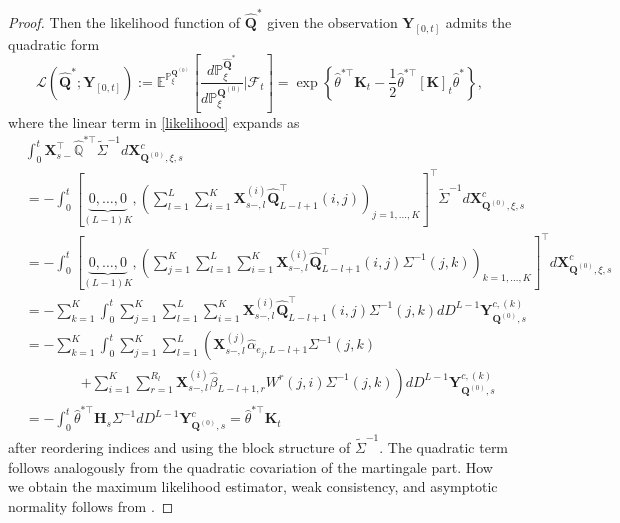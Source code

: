 \documentclass[12pt]{amsart}
\numberwithin{equation}{section}
\newcommand{\E}{\mathbb{E}}
\newcommand{\1}{\mathbf{1}}
\begin{document}
\begin{proof}
Then the likelihood function of $\hat{\mathbf{Q}}^*$ given the observation $\mathbf{Y}_{[0,t]}$ admits the quadratic form
\begin{equation}
\label{likelihoodquad}
\mathcal{L}\left(\hat{\mathbf{Q}}^*;\mathbf{Y}_{[0,t]}\right) := \E^{\mathbb{P}^{\mathbf{Q}^{(0)}}_{\xi}}\left[\frac{d\mathbb{P}^{\hat{\mathbf{Q}}^*}_{\xi}}{d\mathbb{P}^{\mathbf{Q}^{(0)}}_{\xi}}\biggr\vert\mathcal{F}_t\right]=\exp\left\lbrace\hat{\theta}^{*{\top}}\mathbf{K}_t-\frac{1}{2}\hat{\theta}^{*{\top}}[\mathbf{K}]_t\hat{\theta}^{*}\right\rbrace,
\end{equation}
where the linear term in \eqref{likelihood} expands as
\begin{equation*}
    \begin{split}
&\int_0^t\mathbf{X}_{s-}^{\top}\hat{\mathbb{Q}}^{*{\top}}\tilde{\Sigma}^{-1}d\mathbf{X}_{\mathbf{Q}^{(0)},\xi,s}^{c}\\
&=-\int_0^t\left[\underbrace{0,\dots,0}_{(L-1)K},\left(\sum_{l=1}^L\sum_{i=1}^K\mathbf{X}_{s-,l}^{(i)}\hat{\mathbf{Q}}^{\top}_{L-l+1}(i,j)\right)_{j=1,\dots,K}\right]^{\top}\tilde{\Sigma}^{-1}d\mathbf{X}_{\mathbf{Q}^{(0)},\xi,s}^{c}\\
    &=-\int_0^t\left[\underbrace{0,\dots,0}_{(L-1)K},\left(\sum_{j=1}^K\sum_{l=1}^L\sum_{i=1}^K\mathbf{X}_{s-,l}^{(i)}\hat{\mathbf{Q}}^{\top}_{L-l+1}(i,j)\Sigma^{-1}(j,k)\right)_{k=1,\dots,K}\right]^{\top}d\mathbf{X}_{\mathbf{Q}^{(0)},\xi,s}^{c}\\
    &=-\sum_{k=1}^K\int_0^t\sum_{j=1}^K\sum_{l=1}^L\sum_{i=1}^K\mathbf{X}_{s-,l}^{(i)}\hat{\mathbf{Q}}^{\top}_{L-l+1}(i,j)\Sigma^{-1}(j,k)dD^{L-1}\mathbf{Y}^{c,(k)}_{\mathbf{Q}^{(0)},s}\\
    &=-\sum_{k=1}^K\int_0^t\sum_{j=1}^K\sum_{l=1}^L\left(\mathbf{X}_{s-,l}^{(j)}\hat{\alpha}_{e_j,L-l+1}\Sigma^{-1}(j,k)\right.\\
    &\qquad\qquad\left.+\sum_{i=1}^K\sum_{r=1}^{R_l}\mathbf{X}_{s-,l}^{(i)}\hat{\beta}_{L-l+1,r}W^{r}(j,i)\Sigma^{-1}(j,k)\right)dD^{L-1}\mathbf{Y}^{c,(k)}_{\mathbf{Q}^{(0)},s}\\
    &=-\int_0^t\hat{\theta}^{*{\top}}\mathbf{H}_s\Sigma^{-1}dD^{L-1}\mathbf{Y}^{c}_{\mathbf{Q}^{(0)},s}=\hat{\theta}^{*{\top}}\mathbf{K}_t
    \end{split}
\end{equation*}
after reordering indices and using the block structure of $\tilde{\Sigma}^{-1}$. The quadratic term follows analogously from the quadratic covariation of the martingale part. How we obtain the maximum likelihood estimator, weak consistency, and asymptotic normality follows from \cite[Theorem 3.1]{lucchese2026estimation}.
\end{proof}
\end{document}
